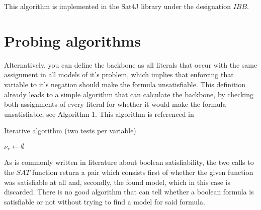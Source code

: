 This algorithm is implemented in the Sat4J library under the designation $IBB$. 


\section{Probing algorithms}
Alternatively, you can define the backbone as all literals that occur with the same assignment in all models of it's problem, which implies that enforcing that variable to it's negation should make the formula unsatisfiable. This definition already leads to a simple algorithm that can calculate the backbone, by checking both assignments of every literal for whether it would make the formula unsatisfiable, see Algorithm 1. This algorithm is referenced in \cite{mjl10}
\begin{algorithm}
\caption{{\sc Iterative algorithm (two tests per variable)}}
\DontPrintSemicolon
{}
$\nu_r \gets \emptyset$\;
\;
\end{algorithm}

As is commonly written in literature about boolean satisfiability, the two calls to the $SAT$ function return a pair which consists first of whether the given function was satisfiable at all and, secondly, the found model, which in this case is discarded. There is no good algorithm that can tell whether a boolean formula is satisfiable or not without trying to find a model for said formula. 
